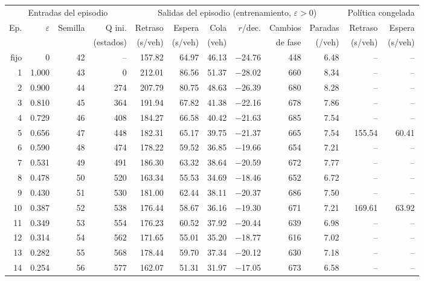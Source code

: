 \begin{table}[H]
\centering
\scriptsize
\setlength{\tabcolsep}{3pt}
\begin{tabular}{rrrrrrrrrrrr}
\toprule
\multicolumn{4}{c}{Entradas del episodio} & \multicolumn{6}{c}{Salidas del episodio (entrenamiento, $\varepsilon>0$)} & \multicolumn{2}{c}{Política congelada} \\
\cmidrule(lr){1-4}\cmidrule(lr){5-10}\cmidrule(lr){11-12}
Ep. & $\varepsilon$ & Semilla & Q ini. & Retraso & Espera & Cola & $r$/dec. & Cambios & Paradas & Retraso & Espera \\
 &  &  & (estados) & (s/veh) & (s/veh) & (veh) &  & de fase & (/veh) & (s/veh) & (s/veh) \\
\midrule
fijo & 0 & 42 & -- & 157.82 & 64.97 & 46.13 & $-$24.76 & 448 & 6.48 & -- & -- \\
\midrule
1 & 1.000 & 43 & 0 & 212.01 & 86.56 & 51.37 & $-$28.02 & 660 & 8.34 & -- & -- \\
2 & 0.900 & 44 & 274 & 207.79 & 80.75 & 48.63 & $-$26.39 & 680 & 8.28 & -- & -- \\
3 & 0.810 & 45 & 364 & 191.94 & 67.82 & 41.38 & $-$22.16 & 678 & 7.86 & -- & -- \\
4 & 0.729 & 46 & 408 & 184.27 & 66.58 & 40.42 & $-$21.63 & 685 & 7.54 & -- & -- \\
5 & 0.656 & 47 & 448 & 182.31 & 65.17 & 39.75 & $-$21.37 & 665 & 7.54 & 155.54 & 60.41 \\
6 & 0.590 & 48 & 474 & 178.22 & 59.52 & 36.85 & $-$19.66 & 654 & 7.21 & -- & -- \\
7 & 0.531 & 49 & 491 & 186.30 & 63.32 & 38.64 & $-$20.59 & 672 & 7.77 & -- & -- \\
8 & 0.478 & 50 & 520 & 163.34 & 55.53 & 34.69 & $-$18.46 & 652 & 6.72 & -- & -- \\
9 & 0.430 & 51 & 530 & 181.00 & 62.44 & 38.11 & $-$20.37 & 686 & 7.50 & -- & -- \\
10 & 0.387 & 52 & 538 & 176.44 & 58.67 & 36.16 & $-$19.30 & 671 & 7.21 & 169.61 & 63.92 \\
11 & 0.349 & 53 & 554 & 176.23 & 60.52 & 37.92 & $-$20.44 & 639 & 6.98 & -- & -- \\
12 & 0.314 & 54 & 562 & 171.65 & 55.01 & 35.20 & $-$18.77 & 616 & 7.02 & -- & -- \\
13 & 0.282 & 55 & 568 & 178.44 & 59.70 & 37.34 & $-$20.12 & 630 & 7.18 & -- & -- \\
14 & 0.254 & 56 & 577 & 162.07 & 51.31 & 31.97 & $-$17.05 & 673 & 6.58 & -- & -- \\

\end{tabular}
\end{table}
